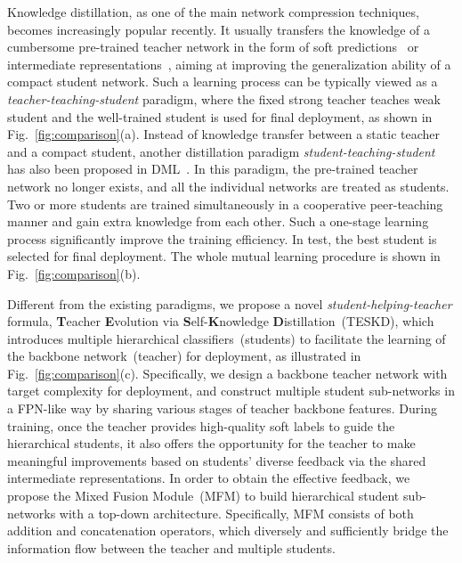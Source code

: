 \documentclass[letterpaper]{article} %
\newcommand{\rewrite}[1]{{\textcolor{red}{#1}}}
\begin{document}
Knowledge distillation, as one of the main network compression techniques, becomes increasingly popular recently. It usually transfers the knowledge of a cumbersome pre-trained teacher network in the form of soft predictions~\cite{hinton2015distilling} or intermediate representations~\cite{romero2014fitnets,zagoruyko2016paying,yim2017gift}, aiming at improving the generalization ability of a compact student network. Such a learning process can be typically viewed as a \textit{teacher-teaching-student} paradigm, where the fixed strong teacher teaches weak student and the well-trained student is used for final deployment, as shown in Fig.~\ref{fig:comparison}(a). 
Instead of knowledge transfer between a static teacher and a compact student, another distillation paradigm \textit{student-teaching-student} has also been proposed in DML~\cite{zhang2018deep}. In this paradigm, the pre-trained teacher network no longer exists, and all the individual networks are treated as students. Two or more students are trained simultaneously in a cooperative peer-teaching manner and gain extra knowledge from each other. Such a one-stage learning process significantly improve the training efficiency. In test, the best student is selected for final deployment. The whole mutual learning procedure is shown in Fig.~\ref{fig:comparison}(b). 

Different from the existing paradigms, we propose a novel \textit{student-helping-teacher} formula, \textbf{T}eacher \textbf{E}volution via \textbf{S}elf-\textbf{K}nowledge \textbf{D}istillation~(TESKD), which introduces multiple hierarchical classifiers~(students) to facilitate the learning of the backbone network~(teacher) for deployment, as illustrated in Fig.~\ref{fig:comparison}(c).
Specifically, we design a backbone teacher network with target complexity for deployment, and construct multiple student sub-networks in a FPN-like \cite{lin2017feature} way by sharing various stages of teacher backbone features. During training, once the teacher provides high-quality soft labels to guide the hierarchical students, it also offers the opportunity for the teacher to make meaningful improvements based on students' diverse feedback via the shared intermediate representations. In order to obtain the effective feedback, we propose the Mixed Fusion Module~(MFM) to build hierarchical student sub-networks with a top-down architecture. Specifically, MFM consists of both addition and concatenation operators, which diversely and sufficiently bridge the information flow between the teacher and multiple students.
\end{document}
